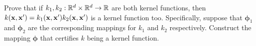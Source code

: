 Prove that if $k_1, k_2: \mathbb{R}^d \times \mathbb{R}^d \rightarrow \mathbb{R}$ are both kernel functions, then $k(\mathbf{x}, \mathbf{x}') = k_1(\mathbf{x}, \mathbf{x}')k_2(\mathbf{x},\mathbf{x}')$ is a kernel function too.
Specifically, suppose that $\boldsymbol{\phi}_1$ and $\boldsymbol{\phi}_2$ are the corresponding mappings for $k_1$ and $k_2$ respectively.
Construct the mapping $\boldsymbol{\phi}$ that certifies $k$ being a kernel function.
